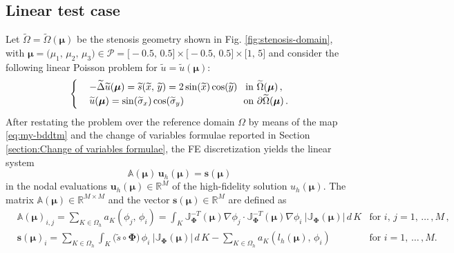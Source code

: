 \documentclass[12pt, a4paper, twoside, openright, notitlepage]{report}
\numberwithin{equation}{chapter}
\theoremstyle{theorem}
\theoremstyle{definition}
\theoremstyle{remark}
\theoremstyle{proposition}
\numberwithin{figure}{chapter}
\newcommand{\wt}[1]{\widetilde{#1}}
\newcommand{\bg}[1]{\boldsymbol{#1}}
\begin{document}
	\subsection{Linear test case}
	\label{section:poisson2d-1}
	
		Let $\wt{\Omega} = \wt{\Omega}(\bg{\mu})$ be the stenosis geometry shown in Fig. \ref{fig:stenosis-domain}, with $\bg{\mu} = \big( \mu_1, \, \mu_2, \, \mu_3 \big) \in \mathcal{P} = \big[-0.5, \, 0.5\big] \times \big[-0.5, \, 0.5\big] \times \big[1 , \, 5\big]$ and consider the following linear Poisson problem for $\wt{u} = \wt{u}(\bg{\mu})$:
		\begin{equation}
			\label{eq:poisson2d-1}
			\begin{cases}
				& - \wt{\Delta} \wt{u}(\bg{\mu}) = \wt{s} (\wt{x}, \, \wt{y}) = 2 \sin(\wt{x}) \cos(\wt{y}) \hspace*{0.3cm} \text{in $\wt{\Omega}(\bg{\mu})$} \, , \\
				& \wt{u}(\bg{\mu}) = \sin(\wt{\sigma}_x) \cos(\wt{\sigma}_y) \hspace*{2.175cm} \text{on $\partial \wt{\Omega}(\bg{\mu})$} \, .
			\end{cases}
		\end{equation}
		After restating the problem over the reference domain $\Omega$ by means of the map \eqref{eq:my-bddtm} and the change of variables formulae reported in Section \ref{section:Change of variables formulae}, the FE discretization yields the linear system
		\begin{equation}
			\label{eq:poisson2d-1-fe-system}
			\mathbb{A}(\bg{\mu}) \, \mathbf{u}_h(\bg{\mu}) = \mathbf{s}(\bg{\mu})
		\end{equation}
		in the nodal evaluations $\mathbf{u}_h(\bg{\mu}) \in \mathbb{R}^M$ of the high-fidelity solution $u_h(\bg{\mu})$. The matrix $\mathbb{A}(\bg{\mu}) \in \mathbb{R}^{M \times M}$ and the vector $\mathbf{s}(\bg{\mu}) \in \mathbb{R}^M$ are defined as
		\begin{equation*}
			\begin{aligned}
				& \mathbb{A}(\bg{\mu})_{i,j} = \sum_{K \in \Omega_h} a_K(\phi_j, \, \phi_i) = \int_K \mathbb{J}_{\bg{\Phi}}^{-T}(\bg{\mu}) \nabla \phi_j \cdot \mathbb{J}_{\bg{\Phi}}^{-T}(\bg{\mu}) \nabla \phi_i ~ \big| \mathbb{J}_{\bg{\Phi}}(\bg{\mu}) \big| \, d\,K & \text{for $i$, $j = 1, \, \ldots \, , M$} \, , \\
				& \mathbf{s}(\bg{\mu})_i = \sum_{K \in \Omega_h} \int_K \big( \wt{s} \circ \bg{\Phi} \big) \, \phi_i ~ \big| \mathbb{J}_{\bg{\Phi}}(\bg{\mu}) \big| \, d\,K - \sum_{K \in \Omega_h} a_K(l_h(\bg{\mu}), \, \phi_i) & \text{for $i = 1, \, \ldots \, , M$}.
			\end{aligned}
		\end{equation*}
\end{document}
